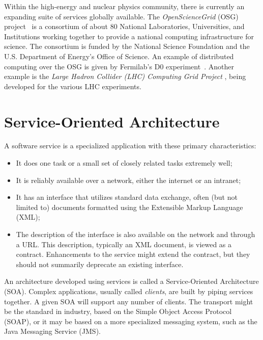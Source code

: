 Within the high-energy and nuclear physics community, there is currently an 
expanding suite of services globally available.  The {\it OpenScienceGrid} 
(OSG) project~\cite{ref:OSG} is a consortium of about 80 National 
Laboratories, Universities, and Institutions working together to provide a 
national computing infrastructure for science.  The consortium is funded by 
the National Science Foundation and the U.S. Department of Energy's Office of 
Science.  An example of distributed computing over the OSG is given by 
Fermilab's D0 experiment~\cite{ref:D0}.  Another example is the 
{\it Large Hadron Collider (LHC) Computing Grid Project}
\cite{ref:LHC,ref:LHC2}, being developed for the various LHC experiments.

\section{Service-Oriented Architecture}

A software service is a specialized application with these primary 
characteristics:

\begin{itemize}

\item It does one task or a small set of closely related tasks extremely well;

\item It is reliably available over a network, either the internet or an 
intranet; 

\item It has an interface that utilizes standard data exchange, often (but
 not limited to) documents formatted using the Extensible Markup Language 
(XML);

\item The description of the interface is also available on the network and 
through a URL.  This description, typically an XML document, is viewed as a 
contract.  Enhancements to the service might extend the contract, but they 
should not summarily deprecate an existing interface.
\end{itemize}

An architecture developed using services is called a Service-Oriented 
Architecture (SOA). Complex applications, usually called {\it clients}, 
are built by piping services together.  A given SOA will support any 
number of clients.  The transport might be the standard in industry, based 
on the Simple Object Access Protocol (SOAP), or it may be based on a more 
specialized messaging system, such as the Java Messaging Service (JMS).

